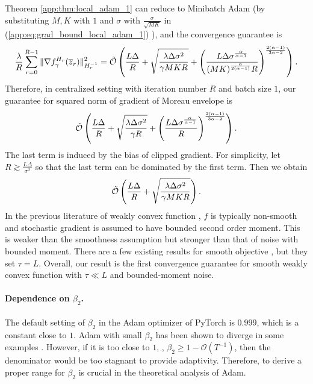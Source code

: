 \documentclass{article} %
\numberwithin{equation}{section}
\renewcommand{\eqref}[1]{(\ref{#1})}
\begin{document}
Theorem \ref{app:thm:local_adam_1} can reduce to Minibatch Adam (by substituting $M,K$ with $1$ and $\sigma$ with $\frac{\sigma}{\sqrt{MK}}$ in \eqref{app:eq:grad_bound_local_adam_1} \citep{Petrov1992}), and the convergence guarantee is
\begin{equation}
    \frac{\lambda}{R}\sum_{r=0}^{R-1}\|\nabla f_\gamma^{H_r} (\overline{z}_r)\|_{H_r^{-1}}^2=\Tilde{\mathcal{O}}\left(
        \frac{L\Delta}{R} + \sqrt{\frac{\lambda\Delta\sigma^2}{\gamma MKR}} + \left(\frac{L\Delta\sigma^{\frac{\alpha}{\alpha-1}}}{(MK)^{\frac{\alpha}{2(\alpha-1)}}R}\right)^{\frac{2(\alpha-1)}{3\alpha-2}}\right).
\end{equation}
Therefore, in centralized setting with iteration number $R$ and batch size $1$, our guarantee for squared norm of gradient of Moreau envelope is
\begin{equation}
    \Tilde{\mathcal{O}}\left(\frac{L\Delta}{R} + \sqrt{\frac{\lambda\Delta\sigma^2}{\gamma R}}+\left(\frac{L\Delta\sigma^{\frac{\alpha}{\alpha-1}}}{R}\right)^{\frac{2(\alpha-1)}{3\alpha-2}}\right).
\end{equation}
The last term is induced by the bias of clipped gradient.
For simplicity, let $R\gtrsim \frac{L\Delta}{\sigma^2}$ so that the last term can be dominated by the first term.
Then we obtain
\begin{equation}
    \Tilde{\mathcal{O}}\left(\frac{L\Delta}{R} + \sqrt{\frac{\lambda\Delta\sigma^2}{\gamma MKR}}\right).
\end{equation}
In the previous literature of weakly convex function \citep{davis2019stochastic, alacaoglu2020convergence, mai2021stability}, $f$ is typically non-smooth and stochastic gradient is assumed to have bounded second order moment. 
This is weaker than the smoothness assumption but stronger than that of noise with bounded moment.
There are a few existing results for smooth objective \citep{davis2019stochastic, mai2020convergence, deng2021minibatch}, but they set $\tau=L$.
Overall, our result is the first convergence guarantee for smooth weakly convex function with $\tau\ll L$ and bounded-moment noise.

\paragraph{Dependence on $\beta_2$.}

The default setting of $\beta_2$ in the Adam optimizer of PyTorch is $0.999$, which is a constant close to $1$. 
Adam with small $\beta_2$ has been shown to diverge in some examples \citep{reddi2019convergence}. 
However, if it is too close to $1$, \eg, $\beta_2\geq 1-\mathcal{O}(T^{-1})$, then the denominator would be too stagnant to provide adaptivity. 
Therefore, to derive a proper range for $\beta_2$ is crucial in the theoretical analysis of Adam.
\end{document}
